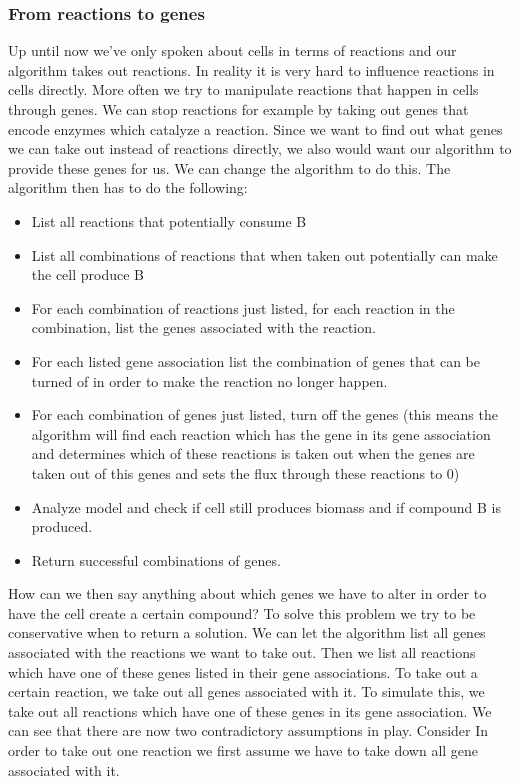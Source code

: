 \documentclass[10pt]{report}
\begin{document}
\subsubsection{From reactions to genes}
Up until now we've only spoken about cells in terms of reactions and our algorithm takes out reactions. In reality it is very hard to influence reactions in cells directly.
More often we try to manipulate reactions that happen in cells through genes.
We can stop reactions for example by taking out genes that encode enzymes which catalyze a reaction.
Since we want to find out what genes we can take out instead of reactions directly, we also would want our algorithm to provide these genes for us.
We can change the algorithm to do this.
The algorithm then has to do the following:
\begin{itemize}
\item List all reactions that potentially consume B
\item List all combinations of reactions that when taken out potentially can make the cell produce B
\item For each combination of reactions just listed, for each reaction in the combination, list the genes associated with the reaction.
\item For each listed gene association list the combination of genes that can be turned of in order to make the reaction no longer happen.
\item For each combination of genes just listed, turn off the genes (this means the algorithm will find each reaction which has the gene in its gene association and determines which of these reactions is taken out when the genes are taken out of this genes and sets the flux through these reactions to 0)
\item Analyze model and check if cell still produces biomass and if compound B is produced.
\item Return successful combinations of genes.
\end{itemize}

How can we then say anything about which genes we have to alter in order to have the cell create a certain compound?
To solve this problem we try to be conservative when to return a solution. We can let the algorithm list all genes associated with the reactions we want to take out. Then we list all reactions which have one of these genes listed in their gene associations. To take out a certain reaction, we take out all genes associated with it. To simulate this, we take out all reactions which have one of these genes in its gene association. We can see that there are now two contradictory assumptions in play. Consider  In order to take out one reaction we first assume we have to take down all gene associated with it.
\end{document}
